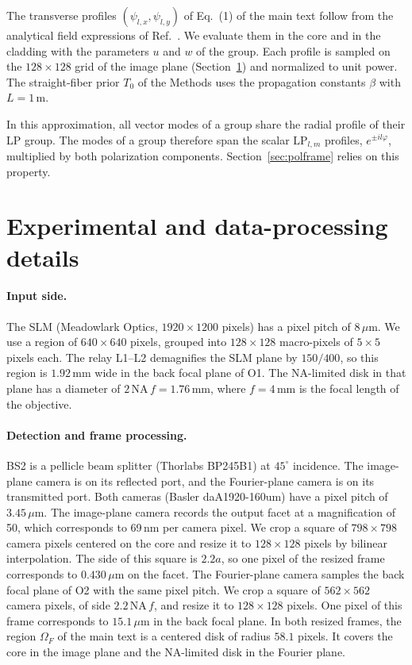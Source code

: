 \documentclass{article}
\begin{document}
The transverse profiles $(\psi_{l,x},\psi_{l,y})$ of Eq.~(1) of the main text follow from the analytical field expressions of Ref.~\cite{fiber_book}.
We evaluate them in the core and in the cladding with the parameters $u$ and $w$ of the group.
Each profile is sampled on the $128\times128$ grid of the image plane (Section~\ref{sec:experiment}) and normalized to unit power.
The straight-fiber prior $T_0$ of the Methods uses the propagation constants $\beta$ with $L=1$\,m.

In this approximation, all vector modes of a group share the radial profile of their LP group.
The modes of a group therefore span the scalar $\mathrm{LP}_{l,m}$ profiles, $e^{\pm il\varphi}$, multiplied by both polarization components.
Section~\ref{sec:polframe} relies on this property.

\section{Experimental and data-processing details}
\label{sec:experiment}
\paragraph{Input side.}
The SLM (Meadowlark Optics, $1920\times1200$ pixels) has a pixel pitch of $8\,\mu$m.
We use a region of $640\times640$ pixels, grouped into $128\times128$ macro-pixels of $5\times5$ pixels each.
The relay L1--L2 demagnifies the SLM plane by $150/400$, so this region is $1.92$\,mm wide in the back focal plane of O1.
The NA-limited disk in that plane has a diameter of $2\,\mathrm{NA}\,f=1.76$\,mm, where $f=4$\,mm is the focal length of the objective.

\paragraph{Detection and frame processing.}
BS2 is a pellicle beam splitter (Thorlabs BP245B1) at $45^\circ$ incidence.
The image-plane camera is on its reflected port, and the Fourier-plane camera is on its transmitted port.
Both cameras (Basler daA1920-160um) have a pixel pitch of $3.45\,\mu$m.
The image-plane camera records the output facet at a magnification of 50, which corresponds to 69\,nm per camera pixel.
We crop a square of $798\times798$ camera pixels centered on the core and resize it to $128\times128$ pixels by bilinear interpolation.
The side of this square is $2.2a$, so one pixel of the resized frame corresponds to $0.430\,\mu$m on the facet.
The Fourier-plane camera samples the back focal plane of O2 with the same pixel pitch.
We crop a square of $562\times562$ camera pixels, of side $2.2\,\mathrm{NA}\,f$, and resize it to $128\times128$ pixels.
One pixel of this frame corresponds to $15.1\,\mu$m in the back focal plane.
In both resized frames, the region $\Omega_F$ of the main text is a centered disk of radius $58.1$ pixels.
It covers the core in the image plane and the NA-limited disk in the Fourier plane.
\end{document}
